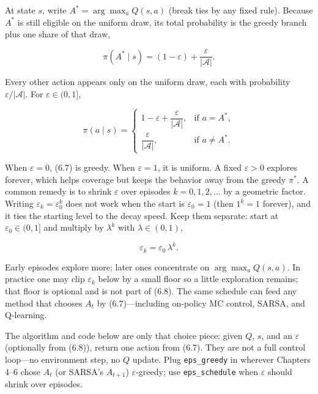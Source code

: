 At state $s$, write $A^*=\arg\max_a Q(s,a)$ (break ties by any fixed rule). Because $A^*$ is still eligible on the uniform draw, its total probability is the greedy branch plus one share of that draw,

\[
\pi(A^*\mid s)
=
(1-\varepsilon)
+
\frac{\varepsilon}{\lvert\mathcal{A}\rvert}.
\]

Every other action appears only on the uniform draw, each with probability $\varepsilon/\lvert\mathcal{A}\rvert$. For $\varepsilon\in(0,1]$,

\begin{equation}
\pi(a\mid s)
=
\begin{cases}
1-\varepsilon+\dfrac{\varepsilon}{\lvert\mathcal{A}\rvert},
&
\text{if }a=A^*,
\\[0.75em]
\dfrac{\varepsilon}{\lvert\mathcal{A}\rvert},
&
\text{if }a\neq A^*.
\end{cases}
\tag{6.7}
\end{equation}

When $\varepsilon=0$, (6.7) is greedy. When $\varepsilon=1$, it is uniform. A fixed $\varepsilon>0$ explores forever, which helps coverage but keeps the behavior away from the greedy $\pi^*$. A common remedy is to shrink $\varepsilon$ over episodes $k=0,1,2,\ldots$ by a geometric factor. Writing $\varepsilon_k=\varepsilon_0^k$ does not work when the start is $\varepsilon_0=1$ (then $1^k=1$ forever), and it ties the starting level to the decay speed. Keep them separate: start at $\varepsilon_0\in(0,1]$ and multiply by $\lambda^k$ with $\lambda\in(0,1)$,

\begin{equation}
\varepsilon_k
=
\varepsilon_0\,\lambda^k.
\tag{6.8}
\end{equation}

Early episodes explore more; later ones concentrate on $\arg\max_a Q(s,a)$. In practice one may clip $\varepsilon_k$ below by a small floor so a little exploration remains; that floor is optional and is not part of (6.8). The same schedule can feed any method that chooses $A_t$ by (6.7)---including on-policy MC control, SARSA, and Q-learning.

The algorithm and code below are only that choice piece: given $Q$, $s$, and an $\varepsilon$ (optionally from (6.8)), return one action from (6.7). They are not a full control loop---no environment step, no $Q$ update. Plug \texttt{eps\_greedy} in wherever Chapters 4--6 chose $A_t$ (or SARSA's $A_{t+1}$) $\varepsilon$-greedy; use \texttt{eps\_schedule} when $\varepsilon$ should shrink over episodes.

